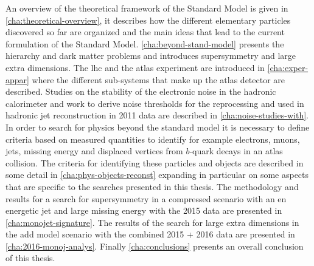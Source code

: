 An overview of the theoretical framework of the Standard Model is given in
\cref{cha:theoretical-overview}, it describes how the different elementary
particles discovered so far are organized and the main ideas that lead to the
current formulation of the Standard Model. \cref{cha:beyond-stand-model}
presents the hierarchy and dark matter problems and introduces supersymmetry and
large extra dimensions. The \gls{lhc} and the \gls{atlas} experiment are
introduced in \cref{cha:exper-appar} where the different sub-systems that make
up the \gls{atlas} detector are described. Studies on the stability of the
electronic noise in the hadronic calorimeter and work to derive noise thresholds
for the reprocessing and used in hadronic jet reconstruction in 2011 data are
described in \cref{cha:noise-studies-with}. In order to search for physics
beyond the standard model it is necessary to define criteria based on measured
quantities to identify for example electrons, muons, jets, missing energy and
displaced vertices from $b$-quark decays in an \gls{atlas} collision. The
criteria for identifying these particles and objects are described in some
detail in \cref{cha:phys-objects-reconst} expanding in particular on some
aspects that are specific to the searches presented in this thesis. The
methodology and results for a search for supersymmetry in a compressed scenario
with an en energetic jet and large missing energy with the 2015 data are
presented in \cref{cha:monojet-signature}. The results of the search for large
extra dimensions in the \gls{add} model scenario with the combined 2015 + 2016
data are presented in \cref{cha:2016-monoj-analys}. Finally
\cref{cha:conclusions} presents an overall conclusion of this thesis.
